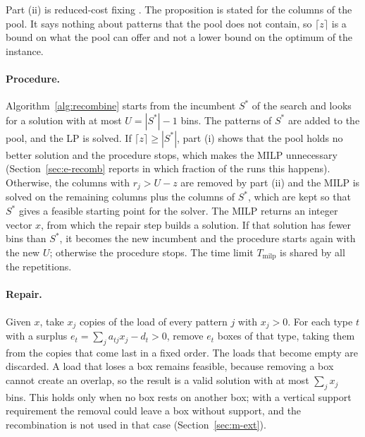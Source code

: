 Part (ii) is reduced-cost fixing \citep{Wolsey1998}. The proposition is stated for the
columns of the pool. It says nothing about patterns that the pool does not contain, so $\lceil
z\rceil$ is a bound on what the pool can offer and not a lower bound on the optimum of the
instance.

\paragraph{Procedure.}
Algorithm~\ref{alg:recombine} starts from the incumbent $S^*$ of the search and looks for a
solution with at most $U=|S^*|-1$ bins. The patterns of $S^*$ are added to the pool, and the LP is
solved. If $\lceil z\rceil\ge|S^*|$, part (i) shows that the pool holds no better solution and
the procedure stops, which makes the MILP unnecessary
(Section~\ref{sec:e-recomb} reports in which fraction of the runs this happens). Otherwise, the
columns with $r_j>U-z$ are removed by part (ii) and the MILP is solved on the remaining columns
plus the columns of $S^*$, which are kept so that $S^*$ gives a feasible starting point for the
solver. The MILP returns an integer vector $x$, from which the repair step builds a solution. If
that solution has fewer bins than $S^*$, it becomes the new incumbent and the procedure starts
again with the new $U$; otherwise the procedure stops. The time limit $T_{\mathrm{milp}}$ is shared
by all the repetitions.

\paragraph{Repair.}
Given $x$, take $x_j$ copies of the load of every pattern $j$ with $x_j>0$. For each type $t$ with
a surplus $e_t=\sum_j a_{tj}x_j-d_t>0$, remove $e_t$ boxes of that type, taking them from the
copies that come last in a fixed order. The loads that become empty are discarded. A load that
loses a box remains feasible, because removing a box cannot create an overlap, so the result is a
valid solution with at most $\sum_j x_j$ bins. This holds only when no box rests on another box;
with a vertical support requirement the removal could leave a box without support, and the
recombination is not used in that case (Section~\ref{sec:m-ext}).

